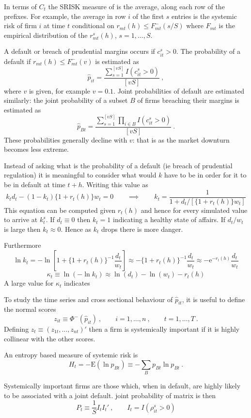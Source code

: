 \documentclass[authoryear]{elsarticle}
\newcommand{\E}{\mathrm{E}}
\newcommand{\e}{\mathrm{e}}
\newcommand{\cq}{\ , \qquad}
\begin{document}
In terms of $C_t$ the SRISK measure of \cite{brownlees2015} is the average, along each row of the prefixes.  For example,  the average in row $i$ of the  first $s$ entries is the systemic risk of firm $i$ at time $t$ conditional on  $r_{mt}(h)\le F_{mt}^{-}(s/S)$ where  $F_{mt}$ is the empirical distribution of the  $r^s_{mt}(h)$, $s=1,\ldots,S$.

A default or breach of prudential margins occurs if $c_{it}^s>0$.  The probability of a default if $r_{mt}(h)\le F_{mt}^{-}(v)$ is estimated as 
$$
\hat p_{it}=\frac{\sum_{s=1}^{[vS]}I(c^s_{it}>0)}{[vS]}\ ,
$$
where $v$ is given, for example $v=0.1$.
Joint probabilities of default are estimated similarly: the joint probability of a subset $B$ of firms  breaching their margins is 
estimated as
$$
\hat p_{Bt} = \frac{\sum_{s=1}^{[vS]}\prod_{i\in B} I(c^s_{it}>0)}{[vS]}\ .
$$
These probabilities generally decline with $v$: that is as the market downturn becomes less extreme.

Instead of asking what is the probability of a default (ie breach of prudential regulation) it is meaningful to consider what would $k$ have to be in order for it to be in default at time $t+h$.    Writing this value as
$$
k_t d_t - (1-k_t)\{1+r_t(h)\}w_t = 0 \qquad \implies \qquad k_t=\frac{1}{1+d_t/[\{1+r_t(h)\}w_t]}
$$
This equation can be computed given $r_t(h)$ and hence for every simulated value to arrive at $k_t^s$.    If $d_t\equiv0$ then $k_t=1$ indicating  a healthy state of affairs.  If $d_t/w_t$ is large then $k_t\approx 0$.    Hence as $k_t$ drops there is more danger. 



Furthermore
$$
\ln k_t = -\ln \left[1+\{1+r_t(h)\}^{-1}\frac{d_t}{w_t}\right]\approx -\{1+r_t(h)\}^{-1}\frac{d_t}{w_t}\approx -\e^{-r_t(h)}\frac{d_t}{w_t}
$$
$$
\kappa_t \equiv \ln(-\ln k_t) \approx  \ln (d_t) - \ln (w_t) - r_t(h)
$$
A large value for $\kappa_t$ indicates 


To study the time series and cross sectional behaviour of $\hat p_{it}$, it is useful to define the  normal scores 
$$
z_{it} \equiv \Phi^-(\hat p_{it})\cq i=1,\ldots, n\cq t=1,\ldots, T\ .
$$
Defining  $z_t\equiv (z_{1t},\ldots,z_{nt})'$ then a firm is systemically important if it is highly collinear with the other scores. 

An entropy based measure of systemic risk is
$$
H_t = -\E(\ln p_{Bt})\equiv -\sum_B p_{Bt}\ln p_{Bt}\ .
$$

Systemically important firms are those which, when in default, are highly likely to be associated with a joint default.
joint probability of matrix is then 
$$
  P_t\equiv \frac{1}{S} I_tI_t'\cq  I_t = I(\rho^s_{it}>0)
$$
\end{document}
